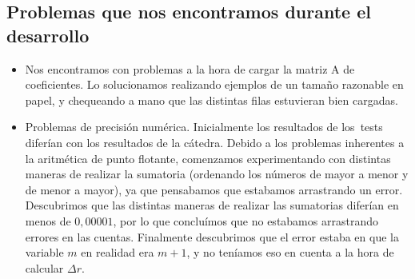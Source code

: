 
\subsection{Problemas que nos encontramos durante el desarrollo}

\begin{itemize}
\item Nos encontramos con problemas a la hora de cargar la matriz A de coeficientes. Lo solucionamos realizando ejemplos de un tamaño razonable en papel, y chequeando a mano que las distintas filas estuvieran bien cargadas.

\item Problemas de precisión numérica. Inicialmente los resultados de los\ tests diferían con los resultados de la cátedra. Debido a los problemas inherentes a la aritmética de punto flotante, comenzamos experimentando con distintas maneras de realizar la sumatoria (ordenando los números de mayor a menor y de menor a mayor), ya que pensabamos que estabamos arrastrando un error. Descubrimos que las distintas maneras de realizar las sumatorias diferían en menos de $0,00001$, por lo que concluímos que no estabamos arrastrando errores en las cuentas. Finalmente descubrimos que el error estaba en que la variable $m$ en realidad era $m+1$, y no teníamos eso en cuenta a la hora de calcular $\Delta r$.

\end{itemize}